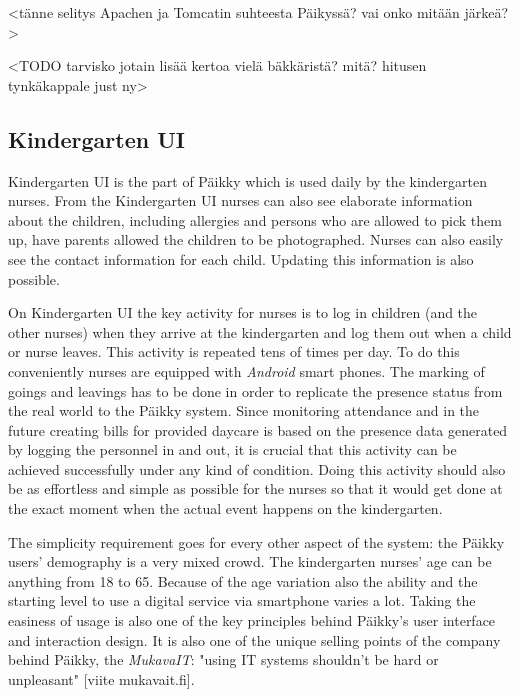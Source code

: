 <tänne selitys Apachen ja Tomcatin suhteesta Päikyssä? vai onko mitään järkeä?>


<TODO tarvisko jotain lisää kertoa vielä bäkkäristä? mitä? hitusen tynkäkappale just ny>



\subsection{Kindergarten UI}

Kindergarten UI is the part of Päikky which is used daily by the kindergarten nurses. From the Kindergarten UI nurses can also see elaborate information about the children, including allergies and persons who are allowed to pick them up, have parents allowed the children to be photographed. Nurses can also easily see the contact information for each child. Updating this information is also possible. %

On Kindergarten UI the key activity for nurses is to log in children (and the other nurses) when they arrive at the kindergarten and log them out when a child or nurse leaves. This activity is repeated tens of times per day. To do this conveniently nurses are equipped with \textit{Android} smart phones. The marking of goings and leavings has to be done in order to replicate the presence status from the real world to the Päikky system. Since monitoring attendance and in the future creating bills for provided daycare is based on the presence data generated by logging the personnel in and out, it is crucial that this activity can be achieved successfully under any kind of condition. Doing this activity should also be as effortless and simple as possible for the nurses so that it would get done at the exact moment when the actual event happens on the kindergarten. 

The simplicity requirement goes for every other aspect of the system: the Päikky users' demography is a very mixed crowd. The kindergarten nurses' age can be anything from 18 to 65. Because of the age variation also the ability and the starting level to use a digital service via smartphone varies a lot. Taking the easiness of usage is also one of the key principles behind Päikky's user interface and interaction design. It is also one of the unique selling points of the company behind Päikky, the \textit{MukavaIT}: "using IT systems shouldn't be hard or unpleasant" [viite mukavait.fi].

